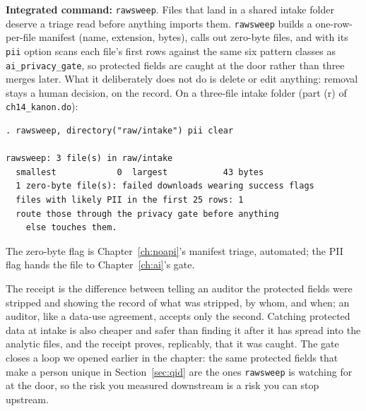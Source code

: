 \begin{kaobox}[frametitle=Package Integration: \texttt{rawsweep}]
\textbf{Integrated command:} \texttt{rawsweep}. Files that land in a shared intake folder deserve a triage read before anything imports them. \texttt{rawsweep} builds a one-row-per-file manifest (name, extension, bytes), calls out zero-byte files, and with its \texttt{pii} option scans each file's first rows against the same six pattern classes as \texttt{ai\_privacy\_gate}, so protected fields are caught at the door rather than three merges later. What it deliberately does not do is delete or edit anything: removal stays a human decision, on the record. On a three-file intake folder (part (r) of \texttt{ch14\_kanon.do}):
\par
{\footnotesize
\begin{verbatim}
. rawsweep, directory("raw/intake") pii clear

rawsweep: 3 file(s) in raw/intake
  smallest            0  largest           43 bytes
  1 zero-byte file(s): failed downloads wearing success flags
  files with likely PII in the first 25 rows: 1
  route those through the privacy gate before anything
    else touches them.
\end{verbatim}
}
The zero-byte flag is Chapter~\ref{ch:noapi}'s manifest triage, automated; the PII flag hands the file to Chapter~\ref{ch:ai}'s gate.
\end{kaobox}

The receipt is the difference between telling an auditor the protected fields were stripped and showing the record of what was stripped, by whom, and when; an auditor, like a data-use agreement, accepts only the second. Catching protected data at intake is also cheaper and safer than finding it after it has spread into the analytic files, and the receipt proves, replicably, that it was caught. The gate closes a loop we opened earlier in the chapter: the same protected fields that make a person unique in Section~\ref{sec:qid} are the ones \texttt{rawsweep} is watching for at the door, so the risk you measured downstream is a risk you can stop upstream.

